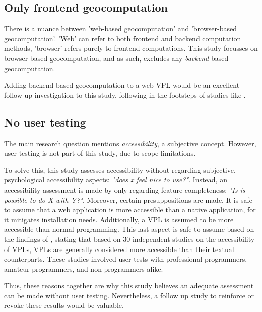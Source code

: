 \subsection*{Only frontend geocomputation}

There is a nuance between 'web-based geocomputation' and 'browser-based geocomputation'. 
'Web' can refer to both frontend and backend computation methods, 'browser' refers purely to frontend computations. 
This study focusses on browser-based geocomputation, and as such, excludes any \emph {backend} based geocomputation.

Adding backend-based geocomputation to a web VPL would be an excellent 
follow-up investigation to this study, following in the footsteps of studies like \cite{panidi_hybrid_2015}. 

\subsection*{No user testing} %

The main research question mentions \emph{accessibility}, a subjective concept.
However, user testing is not part of this study, due to scope limitations. 

To solve this, this study assesses accessibility without regarding subjective, psychological accessibility aspects: \emph{"does x feel nice to use?"}.
Instead, an accessibility assessment is made by only regarding feature completeness: \emph{"Is is possible to do X with Y?"}.
Moreover, certain presuppositions are made.
It is safe to assume that a web application is more accessible than a native application, for it mitigates installation needs. 
Additionally, a VPL is assumed to be more accessible than normal programming.
This last aspect is safe to assume based on the findings of \citet{kuhail_characterizing_2021}, stating that based on 30 independent studies on the accessibility of VPLs, VPLs are generally considered more accessible than their textual counterparts.
These studies involved user tests with professional programmers, amateur programmers, and non-programmers alike. 

Thus, these reasons together are why this study believes an adequate assessment can be made without user testing. 
Nevertheless, a follow up study to reinforce or revoke these results would be valuable.


